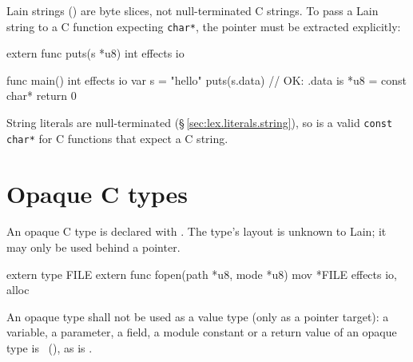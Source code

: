 \pnum
Lain strings () are byte slices, not null-terminated C strings.
To pass a Lain string to a C function expecting \texttt{char*}, the
 pointer must be extracted explicitly:

\begin{laincode}
extern func puts(s *u8) int effects io

func main() int effects io {
    var s = "hello"
    puts(s.data)   // OK: .data is *u8 = const char*
    return 0
}
\end{laincode}

\pnum
String literals are null-terminated (\S\,\ref{sec:lex.literals.string}),
so  is a valid \texttt{const char*} for C functions
that expect a C string.

\section{Opaque C types}
\label{sec:interop.opaque}

\pnum
An opaque C type is declared with .  The type's
layout is unknown to Lain; it may only be used behind a pointer.

\begin{laincode}
extern type FILE
extern func fopen(path *u8, mode *u8) mov *FILE effects io, alloc
\end{laincode}

\begin{constraint}
  An opaque type shall not be used as a value type (only as a pointer
  target): a variable, a parameter, a field, a module constant or a return
  value of an opaque type is \illformed{}~(), as is
  .
\end{constraint}
